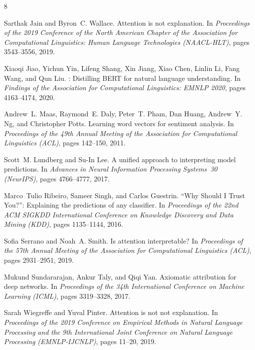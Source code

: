 \documentclass[10pt]{article}
\begin{document}
\begin{thebibliography}{8}

Sarthak Jain and Byron~C. Wallace.
\newblock Attention is not explanation.
\newblock In \emph{Proceedings of the 2019 Conference of the North American
  Chapter of the Association for Computational Linguistics: Human Language
  Technologies (NAACL-HLT)}, pages 3543--3556, 2019.

Xiaoqi Jiao, Yichun Yin, Lifeng Shang, Xin Jiang, Xiao Chen, Linlin Li,
  Fang Wang, and Qun Liu.
: Distilling {BERT} for natural language understanding.
\newblock In \emph{Findings of the Association for Computational Linguistics:
  EMNLP 2020}, pages 4163--4174, 2020.

Andrew~L. Maas, Raymond~E. Daly, Peter~T. Pham, Dan Huang, Andrew~Y. Ng, and
  Christopher Potts.
\newblock Learning word vectors for sentiment analysis.
\newblock In \emph{Proceedings of the 49th Annual Meeting of the Association
  for Computational Linguistics (ACL)}, pages 142--150, 2011.

Scott~M. Lundberg and Su-In Lee.
\newblock A unified approach to interpreting model predictions.
\newblock In \emph{Advances in Neural Information Processing Systems~30
  (NeurIPS)}, pages 4766--4777, 2017.

Marco~Tulio Ribeiro, Sameer Singh, and Carlos Guestrin.
\newblock ``{Why Should I Trust You?}'': Explaining the predictions of any
  classifier.
\newblock In \emph{Proceedings of the 22nd ACM SIGKDD International Conference
  on Knowledge Discovery and Data Mining (KDD)}, pages 1135--1144, 2016.

Sofia Serrano and Noah~A. Smith.
\newblock Is attention interpretable?
\newblock In \emph{Proceedings of the 57th Annual Meeting of the Association
  for Computational Linguistics (ACL)}, pages 2931--2951, 2019.

Mukund Sundararajan, Ankur Taly, and Qiqi Yan.
\newblock Axiomatic attribution for deep networks.
\newblock In \emph{Proceedings of the 34th International Conference on Machine
  Learning (ICML)}, pages 3319--3328, 2017.

Sarah Wiegreffe and Yuval Pinter.
\newblock Attention is not not explanation.
\newblock In \emph{Proceedings of the 2019 Conference on Empirical Methods in
  Natural Language Processing and the 9th International Joint Conference on
  Natural Language Processing (EMNLP-IJCNLP)}, pages 11--20, 2019.

\end{thebibliography}
\end{document}
